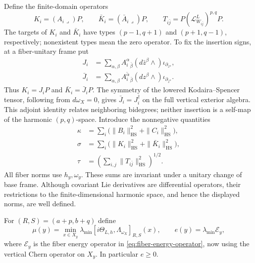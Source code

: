 \documentclass[11pt,reqno]{amsart}
\numberwithin{equation}{section}
\theoremstyle{definition}
\theoremstyle{remark}
\begin{document}
Define the finite-domain operators
\[
 K_i=(A_i\lrcorner)P,\qquad
 \bar K_i=(\bar A_i\lrcorner)P,\qquad
 T_{i\bar j}=P(\mathcal L^L_{W_{i\bar j}})^{p,q}P.
\]
The targets of $K_i$ and $\bar K_i$ have types $(p-1,q+1)$ and $(p+1,q-1)$, respectively; nonexistent types mean the zero operator. To fix the insertion signs, at a fiber-unitary frame put
\begin{equation}\label{eq:ks-insertion-convention}
\begin{split}
 J_i&=\sum_{\alpha,\beta} A_i^\alpha{}_{\bar\beta}
                  (d\bar z^\beta\wedge)\iota_{\partial_{z^\alpha}},\\
 \bar J_i&=\sum_{\alpha,\beta}\overline{A_i^\alpha{}_{\bar\beta}}
                  (dz^\beta\wedge)\iota_{\partial_{\bar z^\alpha}}.
\end{split}
\end{equation}
Thus $K_i=J_iP$ and $\bar K_i=\bar J_iP$. The symmetry of the lowered Kodaira--Spencer tensor, following from $d\omega_X=0$, gives $\bar J_i=J_i^\dagger$ on the full vertical exterior algebra. This adjoint identity relates neighboring bidegrees; neither insertion is a self-map of the harmonic $(p,q)$-space. Introduce the nonnegative quantities
\begin{equation}\label{eq:fibration-costs}
\begin{split}
 \kappa&=\sum_i\bigl(\|B_i\|_{\mathrm{HS}}^2+\|C_i\|_{\mathrm{HS}}^2\bigr),\\
 \sigma&=\sum_i\bigl(\|K_i\|_{\mathrm{HS}}^2+\|\bar K_i\|_{\mathrm{HS}}^2\bigr),\\
 \tau&=\left(\sum_{i,j}\|T_{i\bar j}\|_{\mathrm{HS}}^2\right)^{1/2}.
\end{split}
\end{equation}
All fiber norms use $h_y,\omega_y$. These sums are invariant under a unitary change of base frame. Although covariant Lie derivatives are differential operators, their restrictions to the finite-dimensional harmonic space, and hence the displayed norms, are well defined.

For $(R,S)=(a+p,b+q)$ define
\begin{equation}\label{eq:fibration-margins}
 \mu(y)=\min_{x\in X_y}\lambda_{\min}
       [i\Theta_{L,h},\Lambda_{\omega_X}]_{R,S}(x),
 \qquad e(y)=\lambda_{\min}\mathcal E_y,
\end{equation}
where $\mathcal E_y$ is the fiber energy operator in \eqref{eq:fiber-energy-operator}, now using the vertical Chern operator on $X_y$. In particular $e\geq0$.
\end{document}

